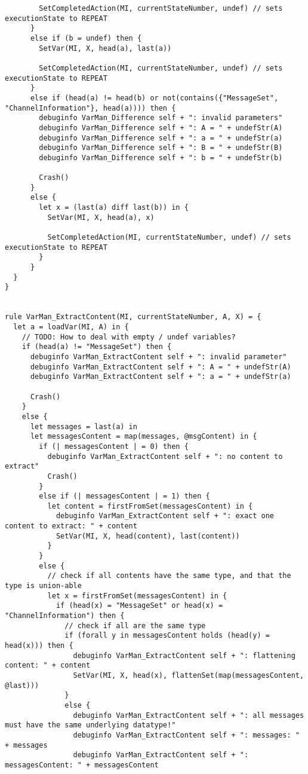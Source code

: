 \begin{listing}[H]
\begin{verbatim}
        SetCompletedAction(MI, currentStateNumber, undef) // sets executionState to REPEAT
      }
      else if (b = undef) then {
        SetVar(MI, X, head(a), last(a))

        SetCompletedAction(MI, currentStateNumber, undef) // sets executionState to REPEAT
      }
      else if (head(a) != head(b) or not(contains({"MessageSet", "ChannelInformation"}, head(a)))) then {
        debuginfo VarMan_Difference self + ": invalid parameters"
        debuginfo VarMan_Difference self + ": A = " + undefStr(A)
        debuginfo VarMan_Difference self + ": a = " + undefStr(a)
        debuginfo VarMan_Difference self + ": B = " + undefStr(B)
        debuginfo VarMan_Difference self + ": b = " + undefStr(b)

        Crash()
      }
      else {
        let x = (last(a) diff last(b)) in {
          SetVar(MI, X, head(a), x)

          SetCompletedAction(MI, currentStateNumber, undef) // sets executionState to REPEAT
        }
      }
  }
}


rule VarMan_ExtractContent(MI, currentStateNumber, A, X) = {
  let a = loadVar(MI, A) in {
    // TODO: How to deal with empty / undef variables?
    if (head(a) != "MessageSet") then {
      debuginfo VarMan_ExtractContent self + ": invalid parameter"
      debuginfo VarMan_ExtractContent self + ": A = " + undefStr(A)
      debuginfo VarMan_ExtractContent self + ": a = " + undefStr(a)

      Crash()
    }
    else {
      let messages = last(a) in
      let messagesContent = map(messages, @msgContent) in {
        if (| messagesContent | = 0) then {
          debuginfo VarMan_ExtractContent self + ": no content to extract"
          Crash()
        }
        else if (| messagesContent | = 1) then {
          let content = firstFromSet(messagesContent) in {
            debuginfo VarMan_ExtractContent self + ": exact one content to extract: " + content
            SetVar(MI, X, head(content), last(content))
          }
        }
        else {
          // check if all contents have the same type, and that the type is union-able
          let x = firstFromSet(messagesContent) in {
            if (head(x) = "MessageSet" or head(x) = "ChannelInformation") then {
              // check if all are the same type
              if (forall y in messagesContent holds (head(y) = head(x))) then {
                debuginfo VarMan_ExtractContent self + ": flattening content: " + content
                SetVar(MI, X, head(x), flattenSet(map(messagesContent, @last)))
              }
              else {
                debuginfo VarMan_ExtractContent self + ": all messages must have the same underlying datatype!"
                debuginfo VarMan_ExtractContent self + ": messages: " + messages
                debuginfo VarMan_ExtractContent self + ": messagesContent: " + messagesContent


\end{verbatim}
\end{listing}
